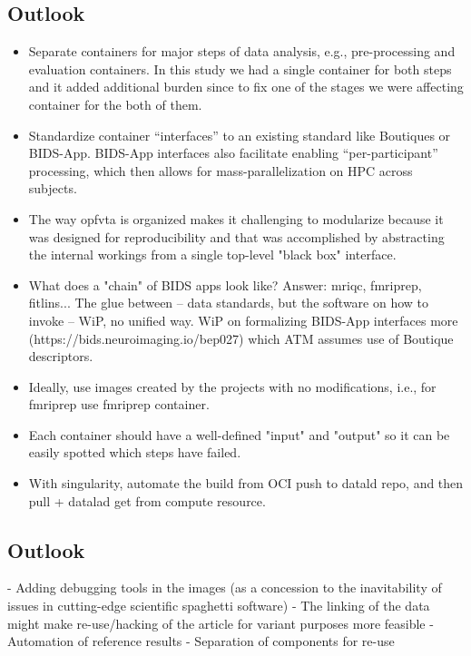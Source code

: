 \subsection{Outlook}

\begin{itemize}
    \item
      Separate containers for major steps of data analysis, e.g., pre-processing and evaluation containers.
      In this study we had a single container for both steps and it added additional burden since to fix one of the stages we were affecting container for the both of them. 
    \item
      Standardize container ``interfaces'' to an existing standard like Boutiques or BIDS-App.
      BIDS-App interfaces also facilitate enabling ``per-participant'' processing, which then allows for mass-parallelization on HPC across subjects.
    \item
      The way opfvta is organized makes it challenging to modularize because it was designed for reproducibility and that was accomplished by abstracting the internal workings from a single top-level "black box" interface.
      \item What does a "chain" of BIDS apps look like?  Answer: mriqc, fmriprep, fitlins... The glue between -- data standards, but the software on how to invoke -- WiP, no unified way. WiP on formalizing BIDS-App interfaces more (https://bids.neuroimaging.io/bep027) which ATM assumes use of Boutique descriptors.
      \item Ideally, use images created by the projects with no modifications, i.e., for fmriprep use fmriprep container.
      \item Each container should have a well-defined "input" and "output" so it can be easily spotted which steps have failed.
  \item With singularity, automate the build from OCI push to datald repo, and then pull + datalad get from compute resource.
\end{itemize}



%
%
%

\subsection{Outlook}
- Adding debugging tools in the images (as a concession to the inavitability of issues in cutting-edge scientific spaghetti software)
- The linking of the data might make re-use/hacking of the article for variant purposes more feasible
- Automation of reference results
- Separation of components for re-use
